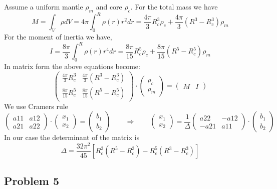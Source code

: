 Assume a uniform mantle $\rho_m$ and core $\rho_c$. For the total mass we have 
\[
M=\int_V \rho dV = 4\pi \int_0^R \rho(r) r^2 dr 
=
\frac{4\pi}{3} R_c^3 \rho_c + \frac{4\pi}{3} (R^3-R_c^3) \rho_m
\]
For the moment of inertia we have,
\[
I 
= \frac{8\pi}{3} \int_0^R \rho(r) r^4 dr
= 
\frac{8\pi}{15} R_c^5 \rho_c + \frac{8\pi}{15} (R^5-R_c^5) \rho_m
\]
In matrix form the above equations become:
\[
\left(
\begin{array}{cc}
\frac{4\pi}{3} R_c^3  & \frac{4\pi}{3} (R^3-R_c^3) \\
\frac{8\pi}{15} R_c^5 &  \frac{8\pi}{15} (R^5-R_c^5) 
\end{array}
\right)
\cdot
\left(
\begin{array}{cc}
\rho_c \\ \rho_m
\end{array}
\right)
=
\left(
\begin{array}{cc}
M & I
\end{array}
\right)
\]
We use Cramers rule
\[
\left(
\begin{array}{cc}
a11 & a12 \\
a21 & a22
\end{array}
\right)
\cdot
\left(
\begin{array}{c}
x_1 \\ x_2
\end{array}
\right)
=
\left(
\begin{array}{c}
b_1 \\ b_2
\end{array}
\right)
\qquad
\Rightarrow
\qquad
\left(
\begin{array}{c}
x_1 \\ x_2
\end{array}
\right)
=
\frac{1}{\Delta}
\left(
\begin{array}{cc}
a22 & -a12 \\
-a21 & a11
\end{array}
\right)
\cdot
\left(
\begin{array}{c}
b_1 \\ b_2
\end{array}
\right)
\]
In our case the determinant of the matrix is 
\[
\Delta = \frac{32\pi^2}{45}\left[ R_c^3(R^5-R_c^3)-R_c^5(R^3-R_c^3)   \right]
\]



\subsection{Problem 5}

